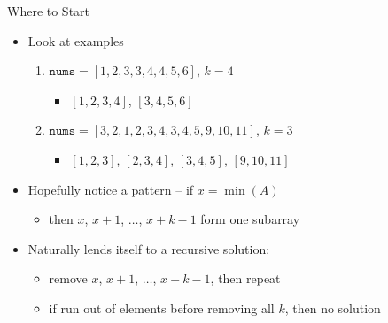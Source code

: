 \begin{frame}{Where to Start}
    \pause
    \begin{itemize}[<+->]
        \item Look at examples
              \begin{enumerate}[<+->]
                  \item $\texttt{nums} = [1,2,3,3,4,4,5,6]$, $k = 4$
                        \begin{itemize}[<+->]
                            \item $[1, 2, 3, 4]$, $[3, 4, 5, 6]$
                        \end{itemize}
                  \item $\texttt{nums} = [3,2,1,2,3,4,3,4,5,9,10,11]$, $k = 3$
                        \begin{itemize}[<+->]
                            \item $[1, 2, 3]$, $[2, 3, 4]$, $[3, 4, 5]$, $[9, 10, 11]$
                        \end{itemize}
              \end{enumerate}
        \item Hopefully notice a pattern -- if $x = \min(A)$
              \begin{itemize}[<+->]
                  \item then $x$, $x+1$, $\dots$, $x+k-1$ form one subarray
              \end{itemize}
        \item Naturally lends itself to a recursive solution:
              \begin{itemize}[<+->]
                  \item remove $x$, $x+1$, $\dots$, $x+k-1$, then repeat
                  \item if run out of elements before removing all $k$, then no solution
              \end{itemize}
    \end{itemize}
\end{frame}

